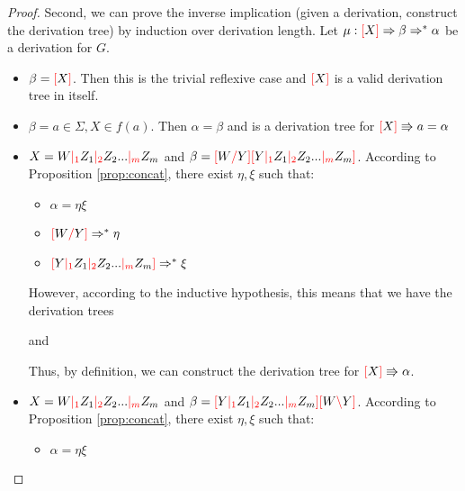 \documentclass[main.tex]{subfiles}
\begin{document}
\begin{proof}
    Second, we can prove the inverse implication (given a derivation,
    construct the derivation tree) by induction over derivation
    length. Let $\mu: \textcolor{red}{[} X \textcolor{red}{]} \Rightarrow \beta \Rightarrow^* \alpha$
    be a derivation for $G$.
    \begin{itemize}
        \item $\beta = \textcolor{red}{[} X \textcolor{red}{]}$. Then this is the trivial reflexive case
            and $\textcolor{red}{[} X \textcolor{red}{]}$ is a valid derivation tree in itself.
        \item $\beta = a \in \Sigma, X \in f(a)$. Then $\alpha = \beta$ and
            is a derivation tree for $ \textcolor{red}{[} X \textcolor{red}{]} \Rrightarrow a = \alpha $
        \item $X = W \textcolor{red}{|_{1}} Z_1 \textcolor{red}{|_{2}} Z_2 ... \textcolor{red}{|_{m}} Z_m$ and
            $\beta = \textcolor{red}{[} W \textcolor{red}{/} Y \textcolor{red}{]} \textcolor{red}{[} Y \textcolor{red}{|_{1}} Z_1 \textcolor{red}{|_{2}} Z_2 ... \textcolor{red}{|_{m}} Z_m \textcolor{red}{]}$.
            According to Proposition \ref{prop:concat}, there exist $\eta, \xi$ such that:
            \begin{itemize}
                \item $\alpha = \eta \xi$
                \item $\textcolor{red}{[} W \textcolor{red}{/} Y \textcolor{red}{]} \Rightarrow^* \eta$
                \item $\textcolor{red}{[} Y \textcolor{red}{|_{1}} Z_1 \textcolor{red}{|_{2}} Z_2 ... \textcolor{red}{|_{m}} Z_m \textcolor{red}{]} \Rightarrow^* \xi$
            \end{itemize}
            However, according to the inductive hypothesis, this means that we
            have the derivation trees
            \begin{center}
                and
            \end{center}
            Thus, by definition, we can construct the derivation tree
            for $\textcolor{red}{[} X \textcolor{red}{]} \Rrightarrow \alpha$.
        \item $X = W \textcolor{red}{|_{1}} Z_1 \textcolor{red}{|_{2}} Z_2 ... \textcolor{red}{|_{m}} Z_m$ and
            $\beta = \textcolor{red}{[} Y \textcolor{red}{|_{1}} Z_1 \textcolor{red}{|_{2}} Z_2 ... \textcolor{red}{|_{m}} Z_m \textcolor{red}{]} \textcolor{red}{[} W \textcolor{red}{\backslash} Y \textcolor{red}{]}$.
            According to Proposition \ref{prop:concat}, there exist $\eta, \xi$ such that:
            \begin{itemize}
                \item $\alpha = \eta \xi$

\end{itemize}
\end{itemize}
\end{proof}
\end{document}
